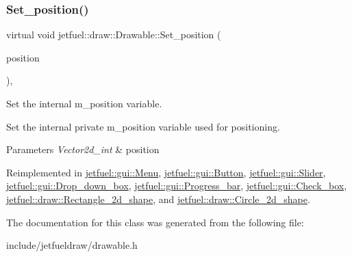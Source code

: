 \subsubsection{\texorpdfstring{Set\+\_\+position()}{Set\_position()}}
{\footnotesize\ttfamily virtual void jetfuel\+::draw\+::\+Drawable\+::\+Set\+\_\+position (\begin{DoxyParamCaption}\item[{const \hyperlink{classjetfuel_1_1draw_1_1Vector2d}{Vector2d\+\_\+int}}]{position }\end{DoxyParamCaption})\hspace{0.3cm}{\ttfamily [inline]}, {\ttfamily [virtual]}}



Set the internal m\+\_\+position variable. 

Set the internal private m\+\_\+position variable used for positioning.


\begin{DoxyParams}{Parameters}
{\em Vector2d\+\_\+int} & position \\
\hline
\end{DoxyParams}


Reimplemented in \hyperlink{classjetfuel_1_1gui_1_1Menu_ab575d5e4ad9d86d6781012e7d1bebc9a}{jetfuel\+::gui\+::\+Menu}, \hyperlink{classjetfuel_1_1gui_1_1Button_a642d3f1412339c826458b80dce76ef34}{jetfuel\+::gui\+::\+Button}, \hyperlink{classjetfuel_1_1gui_1_1Slider_a11721a72699e9d1cdd0f6e5709f003e4}{jetfuel\+::gui\+::\+Slider}, \hyperlink{classjetfuel_1_1gui_1_1Drop__down__box_acba86706261397994c96727a0184a78c}{jetfuel\+::gui\+::\+Drop\+\_\+down\+\_\+box}, \hyperlink{classjetfuel_1_1gui_1_1Progress__bar_a5f52369cccd805274805abf5913535df}{jetfuel\+::gui\+::\+Progress\+\_\+bar}, \hyperlink{classjetfuel_1_1gui_1_1Check__box_aca11db17630485a2c44b19780d10cce6}{jetfuel\+::gui\+::\+Check\+\_\+box}, \hyperlink{classjetfuel_1_1draw_1_1Rectangle__2d__shape_a375b0892589ef7cd1762576e9ce96875}{jetfuel\+::draw\+::\+Rectangle\+\_\+2d\+\_\+shape}, and \hyperlink{classjetfuel_1_1draw_1_1Circle__2d__shape_a551b38063543823483f560bf3eebcd2c}{jetfuel\+::draw\+::\+Circle\+\_\+2d\+\_\+shape}.



The documentation for this class was generated from the following file\+:\begin{DoxyCompactItemize}
\item 
include/jetfueldraw/drawable.\+h\end{DoxyCompactItemize}
